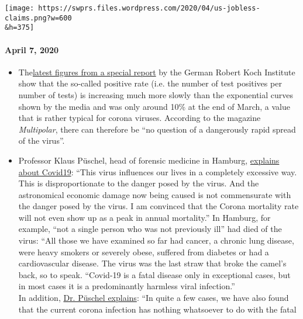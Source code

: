\texttt{[image: https://swprs.files.wordpress.com/2020/04/us-jobless-claims.png?w=600\\\&h=375]}

\hypertarget{april-7-2020}{%
\paragraph{April 7, 2020}\label{april-7-2020}}

\begin{itemize}
\tightlist
\item
  The\href{https://multipolar-magazin.de/artikel/coronavirus-regierung-ignoriert-daten}{latest
  figures from a special report} by the German Robert Koch Institute
  show that the so-called positive rate (i.e. the number of test
  positives per number of tests) is increasing much more slowly than the
  exponential curves shown by the media and was only around 10\% at the
  end of March, a value that is rather typical for corona viruses.
  According to the magazine \emph{Multipolar}, there can therefore be
  ``no question of a dangerously rapid spread of the virus''.
\item
  Professor Klaus Püschel, head of forensic medicine in Hamburg,
  \href{https://www.pressreader.com/germany/hamburger-morgenpost/20200403/281487868456736}{explains
  about Covid19}: ``This virus influences our lives in a completely
  excessive way. This is disproportionate to the danger posed by the
  virus. And the astronomical economic damage now being caused is not
  commensurate with the danger posed by the virus. I am convinced that
  the Corona mortality rate will not even show up as a peak in annual
  mortality.'' In Hamburg, for example, ``not a single person who was
  not previously ill'' had died of the virus: ``All those we have
  examined so far had cancer, a chronic lung disease, were heavy smokers
  or severely obese, suffered from diabetes or had a cardiovascular
  disease. The virus was the last straw that broke the camel's back, so
  to speak. ``Covid-19 is a fatal disease only in exceptional cases, but
  in most cases it is a predominantly harmless viral infection.''\\
  In addition,
  \href{https://www.abendblatt.de/hamburg/article228828787/rechtsmedizin-pueschel-hamburg-corona-virus-infektion-covid-19-coronavirus-krise-patienten-krankenhaeuser-kliniken-infektionsrate-krankheit-pandemie-test-lungenkrankheit-sars-cov-epidemie-sars-cov-2.html}{Dr.
  Püschel explains}: ``In quite a few cases, we have also found that the
  current corona infection has nothing whatsoever to do with the fatal

\end{itemize}
